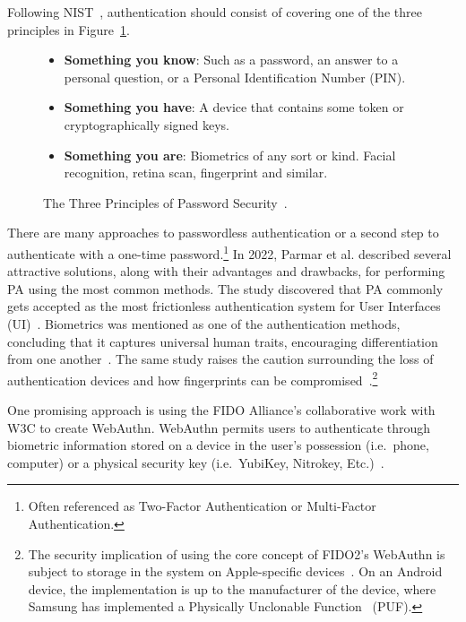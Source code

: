 Following NIST~\cite{NIST:SP:800-171r2, NISTSP800-63-3}, authentication should
consist of covering one of the three principles in
Figure~\ref{fig:secprinciples}.

\begin{figure}[htbp]
  \begin{itemize}
    \item \textbf{Something you know}:
    Such as a password, an answer to a personal question, or a Personal
    Identification Number (PIN).
    \item \textbf{Something you have}:
    A device that contains some token or cryptographically signed keys.
    \item \textbf{Something you are}:
    Biometrics of any sort or kind.
    Facial recognition, retina scan, fingerprint and similar.
  \end{itemize}
  \caption{
    The Three Principles of Password Security~\cite{schneier2000secrets, NIST:SP:800-171r2}.
  }
  \label{fig:secprinciples}
\end{figure}

There are many approaches to passwordless authentication or a second
step to authenticate with a one-time password.\footnote{
  Often referenced as Two-Factor Authentication or Multi-Factor Authentication.
}
In 2022, Parmar et al.\cite{parmar2022} described several attractive solutions,
along with their advantages and drawbacks, for performing PA using the most
common methods.
The study discovered that PA commonly gets accepted as the most frictionless
authentication system for User Interfaces (UI)~\cite{parmar2022}.
Biometrics was mentioned as one of the authentication methods, concluding that
it captures universal human traits, encouraging differentiation from one
another~\cite{parmar2022}.
The same study raises the caution surrounding the loss of authentication
devices and how fingerprints can be compromised~\cite{parmar2022}.\footnote{
  The security implication of using the core concept of FIDO2's WebAuthn is
  subject to storage in the system on Apple-specific
  devices~\cite{appleSecureEnclave}.
  On an Android device, the implementation is up to the manufacturer of the
  device, where Samsung has implemented a Physically Unclonable
  Function~\cite{lee2021samsung} (PUF).
}

One promising approach is using the FIDO Alliance's collaborative work with W3C
to create WebAuthn.
WebAuthn permits users to authenticate through biometric information
stored on a device in the user's possession (i.e.\ phone, computer) or a
physical security key (i.e.\ YubiKey, Nitrokey, Etc.)~\cite{webauthn_level_2}.

